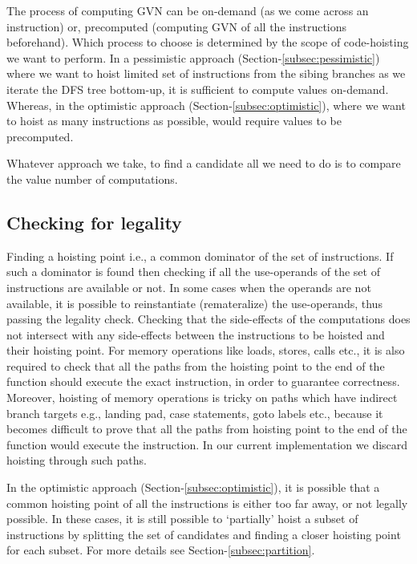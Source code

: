 \documentclass{sig-alternate}
\begin{document}
The process of computing GVN can be on-demand (as we come across an instruction)
or, precomputed (computing GVN of all the instructions beforehand). Which
process to choose is determined by the scope of code-hoisting we want to
perform. In a pessimistic approach (Section-\ref{subsec:pessimistic}) where we
want to hoist limited set of instructions from the sibing branches as we iterate
the DFS tree bottom-up, it is sufficient to compute values on-demand. Whereas,
in the optimistic approach (Section-\ref{subsec:optimistic}), where we want to
hoist as many instructions as possible, would require values to be precomputed.

Whatever approach we take, to find a candidate all we need to do is to compare
the value number of computations.

\subsection{Checking for legality}
\label{subsec:legality}
Finding a hoisting point i.e., a common dominator of the set of instructions. If
such a dominator is found then checking if all the use-operands of the set of
instructions are available or not. In some cases when the operands are not
available, it is possible to reinstantiate (remateralize) the use-operands, thus
passing the legality check. Checking that the side-effects of the computations
does not intersect with any side-effects between the instructions to be hoisted
and their hoisting point. For memory operations like loads, stores, calls etc.,
it is also required to check that all the paths from the hoisting point to the
end of the function should execute the exact instruction, in order to guarantee
correctness. Moreover, hoisting of memory operations is tricky on paths which
have indirect branch targets e.g., landing pad, case statements, goto labels
etc., because it becomes difficult to prove that all the paths from hoisting
point to the end of the function would execute the instruction. In our current
implementation we discard hoisting through such paths.

In the optimistic approach (Section-\ref{subsec:optimistic}), it is possible
that a common hoisting point of all the instructions is either too far away, or
not legally possible. In these cases, it is still possible to `partially' hoist
a subset of instructions by splitting the set of candidates and finding a closer
hoisting point for each subset. For more details see
Section-\ref{subsec:partition}.
\end{document}
